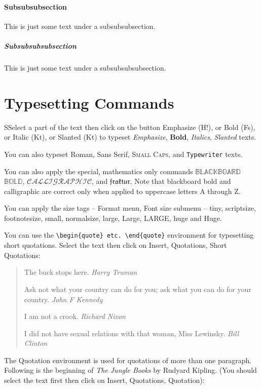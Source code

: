 \documentclass[a4paper]{book}%
\begin{document}
\paragraph{Subsubsubsection}

This is just some  text under a subsubsubsection.

\subparagraph{Subsubsubsubsection}

This is just some text under a subsubsubsubsection.

\section{Typesetting Commands}

SSelect a part of the text then click on the button Emphasize (H!), or Bold (Fs), or
Italic (Kt), or Slanted (Kt) to typeset \emph{Emphasize}, \textbf{Bold},
\textit{Italics}, \textsl{Slanted} texts.

You can also typeset \textrm{Roman}, \textsf{Sans Serif}, \textsc{Small Caps}, and
\texttt{Typewriter} texts.

You can also apply the special, mathematics only commands $\mathbb{BLACKBOARD}$
$\mathbb{BOLD}$, $\mathcal{CALLIGRAPHIC}$, and $\mathfrak{fraktur}$. Note that
blackboard bold and calligraphic are correct only when applied to uppercase letters A
through Z.

You can apply the size tags -- Format menu, Font size submenu -- {\tiny tiny},
{\scriptsize scriptsize}, {\footnotesize footnotesize}, {\small small}, {\normalsize
normalsize}, {\large large}, {\Large Large}, {\LARGE LARGE}, {\huge huge} and {\Huge
Huge}.

You can use the \verb"\begin{quote} etc. \end{quote}" environment for typesetting
short quotations. Select the text then click on Insert, Quotations, Short Quotations:

\begin{quote}
The buck stops here. \emph{Harry Truman}

Ask not what your country can do for you; ask what you can do for your
country. \emph{John F Kennedy}

I am not a crook. \emph{Richard Nixon}

I did not have sexual relations with that woman, Miss Lewinsky. \emph{Bill Clinton}
\end{quote}

The Quotation environment is used for quotations of more than one paragraph. Following
is the beginning of \emph{The Jungle Books} by Rudyard Kipling. (You should select
the text first then click on Insert, Quotations, Quotation):
\end{document}
